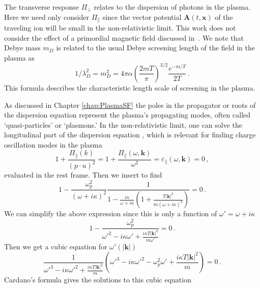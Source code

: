 The transverse response $\Pi_{\perp}$ relates to the dispersion of photons in the plasma. Here we need only consider $\Pi_\parallel$ since the vector potential $\boldsymbol{A}(t,\boldsymbol{x})$ of the traveling ion will be small in the non-relativistic limit. This work does not consider the effect of a primordial magnetic field discussed in~\cite{Steinmetz:2023abc}. We note that Debye mass $m_D$ is related to the usual Debye screening length of the field in the plasma as
\begin{equation}\label{eq:mL}
	1/\lambda_D^{2} = m_D^2= 4 \pi \alpha \left(\frac{2mT}{\pi}\right)^{3/2}\frac{e^{-m/T}}{2T}\,.
\end{equation}
This formula describes the characteristic length scale of screening in the plasma.

As discussed in Chapter \ref{chap:PlasmaSF} the poles in the propagator or roots of the dispersion equation represent the plasma's propagating modes, often called `quasi-particles' or `plasmons.' In the non-relativistic limit, one can solve the longitudinal part of the dispersion equation , which is relevant for finding charge oscillation modes in the plasma
\begin{equation}
    1+ \frac{\Pi_\parallel( k)}{(p\cdot u)^2}= 1+ \frac{\Pi_\parallel(\omega, \boldsymbol{k})}{\omega^2}=\varepsilon_\parallel(\omega,\boldsymbol{k}) =0 \,,
\end{equation}
evaluated in the rest frame. Then we insert  to find
\begin{equation}
   1- \frac{\omega_p^2}{(\omega+ i \kappa)^2} \frac{1}{1-\frac{i\kappa}{\omega+ i \kappa}\left(1+\frac{T |\boldsymbol{k}|^2}{m(\omega+ i \kappa)^2} \right)}=0 \,.
\end{equation}
We can simplify the above expression since this is only a function of $\omega' =\omega+i\kappa$
\begin{equation}
   1- \frac{\omega_p^2}{\omega'^2-i\kappa\omega'+\frac{i\kappa T |\boldsymbol{k}|^2}{m \omega'} }=0 \,.
\end{equation}
Then we get a cubic equation for $\omega'(|\boldsymbol{k}|)$
\begin{equation}\label{eq:dispfact}
   \frac{1}{\omega'^3-i\kappa\omega'^2+\frac{i\kappa T |\boldsymbol{k}|^2}{m} }
    \left(\omega'^3-i\kappa\omega'^2 - \omega_p^2\omega'+\frac{i\kappa T |\boldsymbol{k}|^2}{m} \right)=0 \,.
\end{equation}
Cardano's formula gives the solutions to this cubic equation
